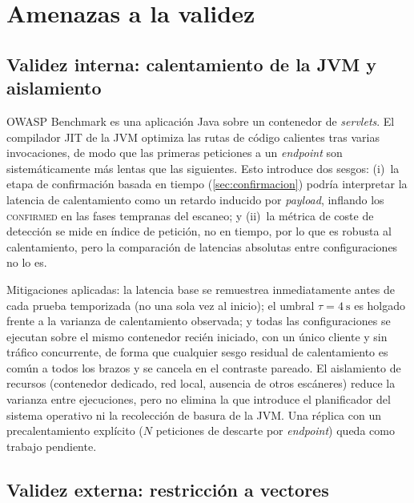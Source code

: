 
\section{Amenazas a la validez}
\label{sec:amenazas}

\subsection{Validez interna: calentamiento de la JVM y aislamiento}

OWASP Benchmark es una aplicación Java sobre un contenedor de \emph{servlets}.
El compilador JIT de la JVM optimiza las rutas de código calientes tras varias
invocaciones, de modo que las primeras peticiones a un \emph{endpoint} son
sistemáticamente más lentas que las siguientes. Esto introduce dos sesgos:
(i)~la etapa de confirmación basada en tiempo (\cref{sec:confirmacion}) podría
interpretar la latencia de calentamiento como un retardo inducido por
\emph{payload}, inflando los \textsc{confirmed} en las fases tempranas del
escaneo; y (ii)~la métrica de coste de detección se mide en índice de petición,
no en tiempo, por lo que es robusta al calentamiento, pero la comparación de
latencias absolutas entre configuraciones no lo es.

Mitigaciones aplicadas: la latencia base se remuestrea inmediatamente antes de
cada prueba temporizada (no una sola vez al inicio); el umbral
$\tau = \SI{4}{\second}$ es holgado frente a la varianza de calentamiento
observada; y todas las configuraciones se ejecutan sobre el mismo contenedor
recién iniciado, con un único cliente y sin tráfico concurrente, de forma que
cualquier sesgo residual de calentamiento es común a todos los brazos y se
cancela en el contraste pareado. El aislamiento de recursos (contenedor
dedicado, red local, ausencia de otros escáneres) reduce la varianza entre
ejecuciones, pero no elimina la que introduce el planificador del sistema
operativo ni la recolección de basura de la JVM. Una réplica con un
precalentamiento explícito ($N$ peticiones de descarte por \emph{endpoint})
queda como trabajo pendiente.

\subsection{Validez externa: restricción a vectores }

